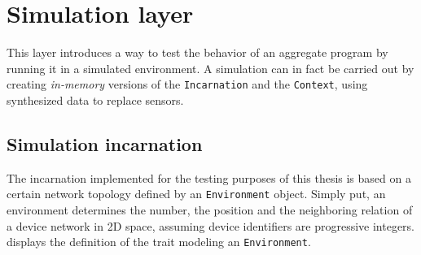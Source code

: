 \section{Simulation layer}

This layer introduces a way to test the behavior of an aggregate program by running it in a simulated environment.
%
A simulation can in fact be carried out by creating \textit{in-memory} versions of the \texttt{Incarnation} and the \texttt{Context}, using synthesized data to replace sensors.

\subsection{Simulation incarnation}

The incarnation implemented for the testing purposes of this thesis is based on a certain network topology defined by an \texttt{Environment} object.
%
Simply put, an environment determines the number, the position and the neighboring relation of a device network in 2D space, assuming device identifiers are progressive integers.
%
 displays the definition of the trait modeling an \texttt{Environment}.
%


